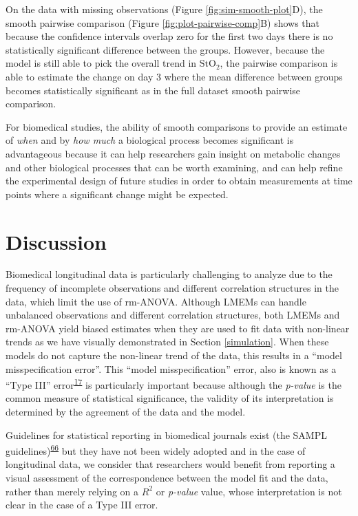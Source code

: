 \documentclass[
]{article}
\begin{document}
On the data with missing observations (Figure \ref{fig:sim-smooth-plot}D), the smooth pairwise comparison (Figure \ref{fig:plot-pairwise-comp}B) shows that because the confidence intervals overlap zero for the first two days there is no statistically significant difference between the groups. However, because the model is still able to pick the overall trend in \(\mbox{StO}_2\), the pairwise comparison is able to estimate the change on day 3 where the mean difference between groups becomes statistically significant as in the full dataset smooth pairwise comparison.

For biomedical studies, the ability of smooth comparisons to provide an estimate of \emph{when} and by \emph{how much} a biological process becomes significant is advantageous because it can help researchers gain insight on metabolic changes and other biological processes that can be worth examining, and can help refine the experimental design of future studies in order to obtain measurements at time points where a significant change might be expected.

\hypertarget{discussion}{%
\section{Discussion}\label{discussion}}

Biomedical longitudinal data is particularly challenging to analyze due to the frequency of incomplete observations and different correlation structures in the data, which limit the use of rm-ANOVA. Although LMEMs can handle unbalanced observations and different correlation structures, both LMEMs and rm-ANOVA yield biased estimates when they are used to fit data with non-linear trends as we have visually demonstrated in Section \ref{simulation}. When these models do not capture the non-linear trend of the data, this results in a ``model misspecification error''. This ``model misspecification'' error, also is known as a ``Type III'' error\textsuperscript{\protect\hyperlink{ref-dennis2019}{17}} is particularly important because although the \emph{p-value} is the common measure of statistical significance, the validity of its interpretation is determined by the agreement of the data and the model.

Guidelines for statistical reporting in biomedical journals exist (the SAMPL guidelines)\textsuperscript{\protect\hyperlink{ref-lang2015}{66}} but they have not been widely adopted and in the case of longitudinal data, we consider that researchers would benefit from reporting a visual assessment of the correspondence between the model fit and the data, rather than merely relying on a \(R^2\) or \emph{p-value} value, whose interpretation is not clear in the case of a Type III error.
\end{document}
